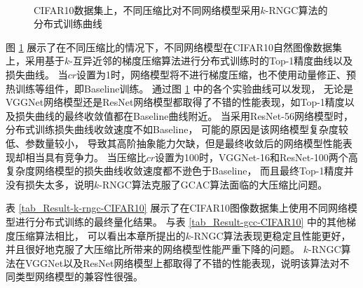 \documentclass{xdupgthesis}
\begin{document}
\begin{figure}[H]
{        \label{fig_Result-k-rngc-resnet110-acc}
    }
     \\
    \caption{CIFAR10数据集上，不同压缩比对不同网络模型采用$k$-RNGC算法的分布式训练曲线}
    \label{fig_Result-k-rngc-CIFAR10}
\end{figure}

图 \ref*{fig_Result-k-rngc-CIFAR10} 展示了在不同压缩比的情况下，不同网络模型在CIFAR10自然图像数据集上，采用基于$k$-互异近邻的梯度压缩算法进行分布式训练时的Top-1精度曲线以及损失曲线。
当$cr$设置为1时，网络模型将不进行梯度压缩，也不使用动量修正、预热训练等组件，即Baseline训练。
通过图 \ref*{fig_Result-k-rngc-CIFAR10} 中的各个实验曲线可以发现，
无论是VGGNet网络模型还是ResNet网络模型都取得了不错的性能表现，如Top-1精度以及损失曲线的最终收敛值都在Baseline曲线附近。
当采用ResNet-56网络模型时，分布式训练损失曲线收敛速度不如Baseline，
可能的原因是该网络模型复杂度较低、参数量较小，
导致其高阶抽象能力欠缺，但是最终收敛后的网络模型性能表现却相当具有竞争力。
当压缩比$cr$设置为100时，VGGNet-16和ResNet-100两个高复杂度网络模型的损失曲线收敛速度都不逊色于Baseline，
而且最终Top-1精度并没有损失太多，说明$k$-RNGC算法克服了GCAC算法面临的大压缩比问题。

表 \ref*{tab_Result-k-rngc-CIFAR10} 展示了在CIFAR10图像数据集上使用不同网络模型进行分布式训练的最终量化结果。
与表 \ref*{tab_Result-gcc-CIFAR10} 中的其他梯度压缩算法相比，
可以看出本章所提出的$k$-RNGC算法表现更稳定且性能更好，并且很好地克服了大压缩比所带来的网络模型性能严重下降的问题。
$k$-RNGC算法在VGGNet以及ResNet网络模型上都取得了不错的性能表现，说明该算法对不同类型网络模型的兼容性很强。
\end{document}
